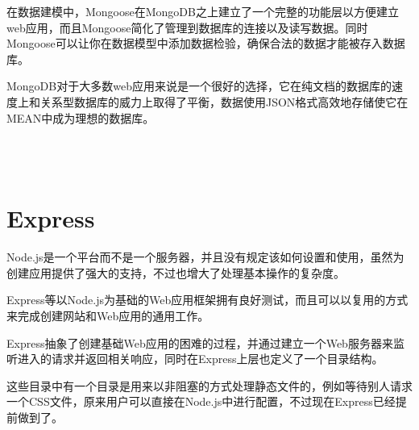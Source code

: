 在数据建模中，Mongoose在MongoDB之上建立了一个完整的功能层以方便建立web应用，而且Mongoose简化了管理到数据库的连接以及读写数据。同时Mongoose可以让你在数据模型中添加数据检验，确保合法的数据才能被存入数据库。

MongoDB对于大多数web应用来说是一个很好的选择，它在纯文档的数据库的速度上和关系型数据库的威力上取得了平衡，数据使用JSON格式高效地存储使它在MEAN中成为理想的数据库。




\begin{lstlisting}[language=JavaScript]

\end{lstlisting}






\begin{lstlisting}[language=JavaScript]

\end{lstlisting}






\begin{lstlisting}[language=JavaScript]

\end{lstlisting}






\begin{lstlisting}[language=JavaScript]

\end{lstlisting}







\section{Express}

Node.js是一个平台而不是一个服务器，并且没有规定该如何设置和使用，虽然为创建应用提供了强大的支持，不过也增大了处理基本操作的复杂度。

Express等以Node.js为基础的Web应用框架拥有良好测试，而且可以以复用的方式来完成创建网站和Web应用的通用工作。

Express抽象了创建基础Web应用的困难的过程，并通过建立一个Web服务器来监听进入的请求并返回相关响应，同时在Express上层也定义了一个目录结构。

这些目录中有一个目录是用来以非阻塞的方式处理静态文件的，例如等待别人请求一个CSS文件，原来用户可以直接在Node.js中进行配置，不过现在Express已经提前做到了。

